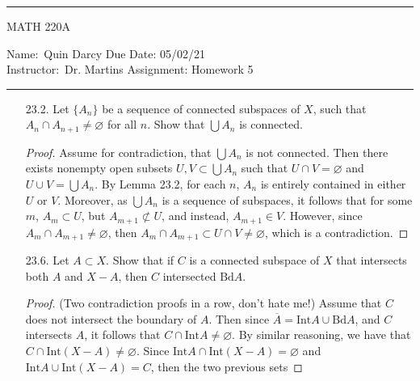\documentclass[12pt]{article}
\theoremstyle{definition}
\begin{document}
    \thispagestyle{empty}\hrule

    \begin{center}
        \vspace{.4cm} { \large MATH 220A}
    \end{center}
    {Name:\ Quin Darcy \hspace{\fill} Due Date: 05/02/21 \\
    { Instructor:}\ Dr. Martins \hspace{\fill} Assignment:
    Homework 5 \\ \hrule}

    \begin{enumerate}
        \item[23.2.] Let $\{A_n\}$ be a sequence of connected subspaces of $X$,
            such that $A_n\cap A_{n+1}\neq \varnothing$ for all $n$. Show that
            $\bigcup A_n$ is connected.
            \begin{proof}
                Assume for contradiction, that $\bigcup A_n$ is not connected.
                Then there exists nonempty open subsets $U, V\subset\bigcup
                A_n$ such that $U\cap V=\varnothing$ and $U\cup V=\bigcup A_n$.
                By Lemma 23.2, for each $n$, $A_n$ is entirely contained in
                either $U$ or $V$. Moreover, 
                as $\bigcup A_n$ is a sequence of subspaces, it follows that
                for some $m$, $A_m\subset U$, but $A_{m+1}\not\subset U$, and
                instead, $A_{m+1}\in V$. However, since $A_m\cap
                A_{m+1}\neq\varnothing$, then $A_m\cap A_{m+1}\subset U\cap
                V\neq\varnothing$, which is a contradiction.
            \end{proof}
        \item[23.6.] Let $A\subset X$. Show that if $C$ is a connected subspace
            of $X$ that intersects both $A$ and $X-A$, then $C$ intersected
            $\text{Bd}A$.
            \begin{proof}
                (Two contradiction proofs in a row, don't hate me!) Assume that
                $C$ does not intersect the boundary of $A$. Then since
                $\overline{A}=\text{Int}A\cup\text{Bd}A$, and $C$ intersects
                $A$, it follows that $C\cap\text{Int}A\neq\varnothing$. By
                similar reasoning, we have that
                $C\cap\text{Int}(X-A)\neq\varnothing$. Since
                $\text{Int}A\cap\text{Int}(X-A)=\varnothing$ and
                $\text{Int}A\cup\text{Int}(X-A)=C$, then the two previous sets

\end{proof}
\end{enumerate}
\end{document}
